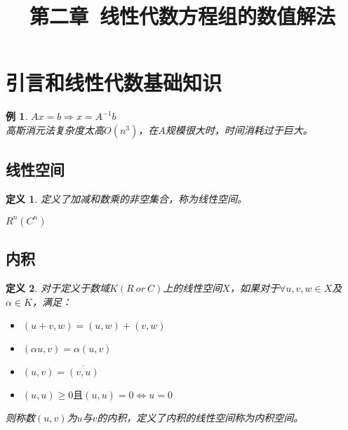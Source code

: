 \documentclass[a4paper]{article}
\title{第二章\ 线性代数方程组的数值解法}
\author{}
\date{}
\newtheorem{definition}{定义}[section]
\newtheorem{example}{例}[section]
\begin{document}
\maketitle

\section{引言和线性代数基础知识}

\begin{example}
$Ax=b \Rightarrow x=A^{-1}b$ \\
高斯消元法复杂度太高$O(n^3)$，在$A$规模很大时，时间消耗过于巨大。
\end{example}
\subsection{线性空间}
\begin{definition}
定义了加减和数乘的非空集合，称为线性空间。
\end{definition}
$R^n(C^n)$

\subsection{内积}
\begin{definition}
对于定义于数域$K(R \ or\  C)$上的线性空间$X$，如果对于$\forall$$u, v, w \in X$及$\alpha \in K$，满足：
\begin{itemize}
\item $(u+v, w)=(u, w) + (v, w)$
\item $(\alpha u, v)=\alpha (u, v)$
\item $(u, v)=\overline{(v, u)}$
\item $(u, u)\ge 0 且 (u, u)=0 \Leftrightarrow u=0$
\end{itemize}
则称数$(u,v)$为$u$与$v$的内积，定义了内积的线性空间称为内积空间。
\end{definition}
\end{document}
